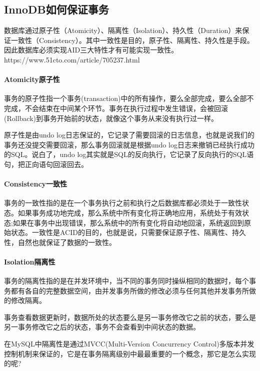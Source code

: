 \documentclass[../../../interview-questions.tex]{subfiles}
\begin{document}
\subsection{InnoDB如何保证事务}

数据库通过原子性（Atomicity）、隔离性（Isolation）、持久性（Duration）来保证一致性（Consistency）。其中一致性是目的，原子性、隔离性、持久性是手段。因此数据库必须实现AID三大特性才有可能实现一致性。https://www.51cto.com/article/705237.html

\paragraph{Atomicity原子性}

事务的原子性指一个事务(transaction)中的所有操作，要么全部完成，要么全部不完成，不会结束在中间某个环节。事务在执行过程中发生错误，会被回滚(Rollback)到事务开始前的状态，就像这个事务从来没有执行过一样。

原子性是由undo log日志保证的，它记录了需要回滚的日志信息，也就是说我们的事务还没提交需要回滚，那么事务回滚就是根据undo log日志来撤销已经执行成功的SQL。说白了，undo log其实就是SQL的反向执行，它记录了反向执行的SQL语句，把正向语句回滚回去。

\paragraph{Consistency一致性}

事务的一致性指的是在一个事务执行之前和执行之后数据库都必须处于一致性状态。如果事务成功地完成，那么系统中所有变化将正确地应用，系统处于有效状态;如果在事务中出现错误，那么系统中的所有变化将自动地回滚，系统返回到原始状态。一致性是ACID的目的，也就是说，只需要保证原子性、隔离性、持久性，自然也就保证了数据的一致性。

\paragraph{Isolation隔离性}

事务的隔离性指的是在并发环境中，当不同的事务同时操纵相同的数据时，每个事务都有各自的完整数据空间，由并发事务所做的修改必须与任何其他并发事务所做的修改隔离。

事务查看数据更新时，数据所处的状态要么是另一事务修改它之前的状态，要么是另一事务修改它之后的状态，事务不会查看到中间状态的数据。

在MySQL中隔离性是通过MVCC(Multi-Version Concurrency Control)多版本并发控制机制来保证的，它是在事务隔离级别中最最重要的一个概念，那它是怎么实现的呢?
\end{document}
